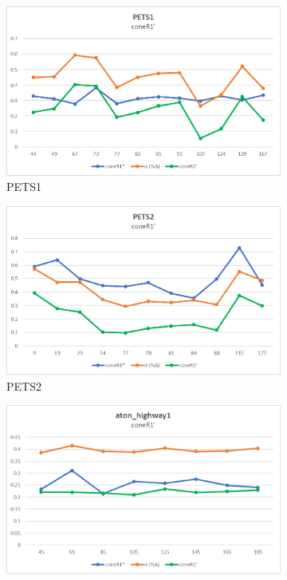 \begin{appendices}
\begin{figure}
  \begin{subfigure}{.45\linewidth}
  \includegraphics[width=1\linewidth]{figures/appendix/pets1_prime.jpg}
  \caption{PETS1}
\end{subfigure}
\hfill
\begin{subfigure}{.45\linewidth}
  \includegraphics[width=1\linewidth]{figures/appendix/pets2_prime.jpg}
  \caption{PETS2}
\end{subfigure}
\hfill
\begin{subfigure}{.45\linewidth}
  \includegraphics[width=1\linewidth]{figures/appendix/highway1_prime.jpg}

\end{subfigure}
\end{figure}
\end{appendices}

